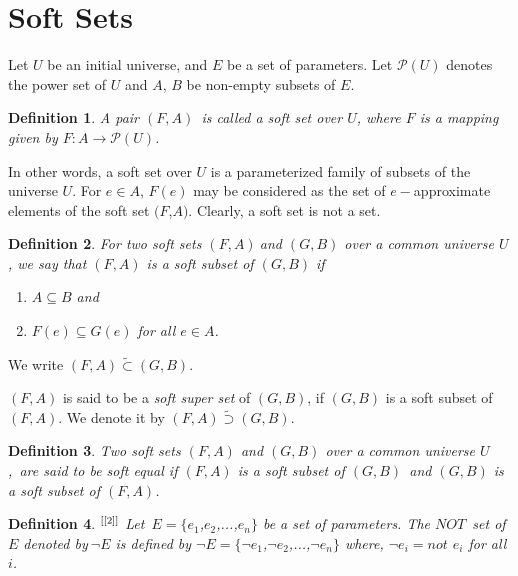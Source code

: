 \documentclass{amsart}
\theoremstyle{plain}
\newtheorem{definition}{Definition}
\numberwithin{equation}{section}
\begin{document}
\section{Soft Sets}

Let $U$ be an initial universe, and $E$ be a set of parameters. Let $\mathcal{P}(U)$ denotes the power set of $U$ and $A$, $B$ be non-empty
subsets of $E$.

\begin{definition}
\cite{[1]} A pair $(F,A)$\ is called a \textit{soft set} over $U$, where $F$
is a mapping given by $F:A\rightarrow \mathcal{P}(U)$.
\end{definition}

In other words, a soft set over $U$ is a parameterized family of subsets of
the universe $U$. For $e\in A$, $F(e)$ may be considered as the set of $e-$approximate elements of the soft set $(F$,$A)$. Clearly, a soft set is not a
set.

\begin{definition}
\cite{[3]} For two soft sets $(F,A)\ $and $(G,B)$ over a common universe $U$, we say that $(F,A)$ is a \textit{soft subset} of $(G,B)$ if

\begin{enumerate}
\item $A\subseteq B$ and

\item $F(e)\subseteq G(e)$ for all $e\in A$.
\end{enumerate}
\end{definition}

We write $(F,A)\widetilde{\subset }(G,B)$.

$(F,A)$ is said to be a \textit{soft super set} of $(G,B)$, if $(G,B)$ is a
soft subset of $(F,A)$. We denote it by $(F,A)\widetilde{\supset }(G,B)$.

\begin{definition}
\cite{[2]} Two soft sets $(F,A)$ and $(G,B)$ over a common universe $U$,\
are said to be \textit{soft equal} if $(F,A)$ is a soft subset of $(G,B)$\
and $(G,B)$ is a soft subset of $(F,A)$.
\end{definition}

\begin{definition}
$^{\text{\cite{[2]}}}$ Let\ $E=\{e_{1}$,$e_{2}$,...,$e_{n}\}$ be a set of
parameters. The $NOT$\textit{\ set of }$E$ denoted by$\ \lnot E$ is defined
by $\lnot E=\{\lnot e_{1}$,$\lnot e_{2}$,...,$\lnot e_{n}\}$ where, $\lnot
e_{i}=not$ $e_{i}$ for all $i$.
\end{definition}
\end{document}
